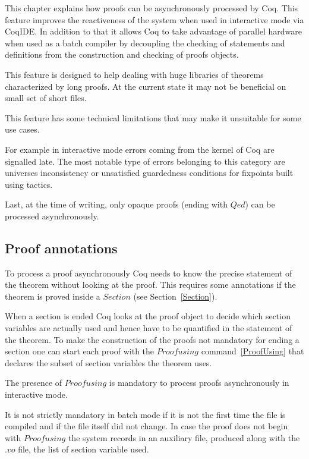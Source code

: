 
\label{pralitp}

This chapter explains how proofs can be asynchronously processed by Coq.
This feature improves the reactiveness of the system when used in interactive
mode via CoqIDE.  In addition to that it allows Coq to take advantage of
parallel hardware when used as a batch compiler by decoupling the checking
of statements and definitions from the construction and checking of proofs
objects.

This feature is designed to help dealing with huge libraries of theorems
characterized by long proofs.  At the current state it may not be beneficial
on small set of short files.

This feature has some technical limitations that may make it unsuitable for
some use cases.

For example in interactive mode errors coming from the kernel of Coq are
signalled late.  The most notable type of errors belonging to this category are
universes inconsistency or unsatisfied guardedness conditions for fixpoints
built using tactics.

Last, at the time of writing, only opaque proofs (ending with $Qed$) can be
processed asynchronously.

\subsection{Proof annotations}

To process a proof asynchronously Coq needs to know the precise statement
of the theorem without looking at the proof.  This requires some annotations
if the theorem is proved inside a $Section$ (see Section~\ref{Section}).

When a section is ended Coq looks at the proof object to decide which
section variables are actually used and hence have to be quantified in the
statement of the theorem.  To make the construction of the proofs not
mandatory for ending a section one can start each proof with the
$Proof using$ command~\ref{ProofUsing} that declares the subset of section
variables the theorem uses.

The presence of $Proof using$ is mandatory to process proofs asynchronously
in interactive mode.

It is not strictly mandatory in batch mode if it is not the first time the
file is compiled and if the file itself did not change.  In case the
proof does not begin with $Proof using$ the system records in an auxiliary
file, produced along with the $.vo$ file, the list of section variable used.

